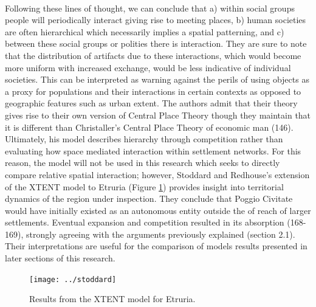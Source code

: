 \documentclass[12pt,a4paper]{thesis}
\begin{document}
\paragraph{}
Following these lines of thought, we can conclude that a) within social groups people will periodically interact giving rise to meeting places, b) human societies are often hierarchical  which necessarily implies a spatial patterning, and c) between these social groups or polities there is interaction. They are sure to note that the distribution of artifacts due to these interactions, which would become more uniform with increased  exchange, would be less indicative of individual societies. This can be interpreted as warning against the perils of using objects as a proxy for populations and their interactions in certain contexts as opposed to geographic features such as urban extent. The authors admit that their theory gives rise to their own version of Central Place Theory though they maintain that it is different than Christaller's Central Place Theory of economic man (146). Ultimately, his model describes hierarchy through competition rather than evaluating how space mediated interaction within settlement networks. For this reason, the model will not be used in this research which seeks to directly compare relative spatial interaction; however, Stoddard and Redhouse's \citeyearpar{StoRed11} extension of the XTENT model to Etruria (Figure \ref{fig:stoddard}) provides insight into territorial dynamics of the region under inspection. They conclude that Poggio Civitate would have initially existed as an autonomous entity outside the of reach of larger settlements. Eventual expansion and competition resulted in its absorption (168-169), strongly agreeing with the arguments previously explained (section 2.1). Their interpretations are useful for the comparison of models results presented in later sections of this research. 

\begin{figure}
\centering
\texttt{[image: ../stoddard]}
\caption{Results from the XTENT model for Etruria.}
\label{fig:stoddard}
\end{figure}
\end{document}
